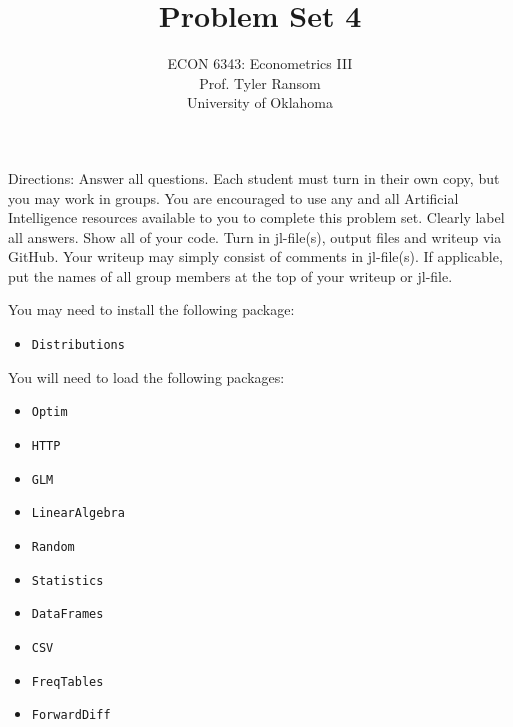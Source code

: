 \documentclass[12pt,english]{article}
\begin{document}
\title{Problem Set 4}
\author{ECON 6343: Econometrics III\\
Prof. Tyler Ransom\\
University of Oklahoma}
\date{}%

\maketitle
Directions: Answer all questions. Each student must turn in their own copy, but you may work in groups. You are encouraged to use any and all Artificial Intelligence resources available to you to complete this problem set. Clearly label all answers. Show all of your code. Turn in jl-file(s), output files and writeup via GitHub. Your writeup may simply consist of comments in jl-file(s). If applicable, put the names of all group members at the top of your writeup or jl-file.

You may need to install the following package:
\begin{itemize}
    \item[~] \texttt{Distributions}
\end{itemize}

You will need to load the following packages:
\begin{itemize}
    \item[~] \texttt{Optim} 
    \item[~] \texttt{HTTP} 
    \item[~] \texttt{GLM} 
    \item[~] \texttt{LinearAlgebra} 
    \item[~] \texttt{Random} 
    \item[~] \texttt{Statistics} 
    \item[~] \texttt{DataFrames} 
    \item[~] \texttt{CSV} 
    \item[~] \texttt{FreqTables}
    \item[~] \texttt{ForwardDiff}
\end{itemize}
\end{document}
